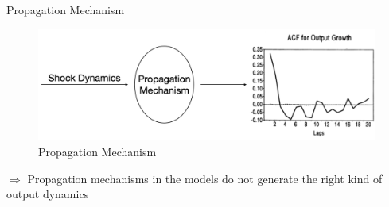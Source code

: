 \documentclass[10pt]{beamer}
\begin{document}
\begin{frame}{Propagation Mechanism}
    \begin{figure}
        \centering
        \includegraphics[width=\linewidth]{figures/propagation.png}
        \caption{Propagation Mechanism}
    \end{figure}

    $\Rightarrow$ Propagation mechanisms in the models do not generate the right kind of output dynamics
\end{frame}
\end{document}

